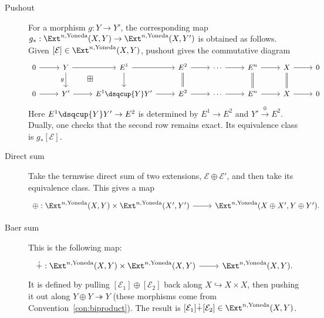 \begin{description}
	\item[Pushout] For a morphism $g:Y\to Y'$, the corresponding map
	$g_*:\Ext^{n,\text{Yoneda}}(X,Y)\to
	\Ext^{n,\text{Yoneda}}(X,Y')$ is obtained as follows. Given
	$[\mathcal{E}]\in\Ext^{n,\text{Yoneda}}(X,Y)$, pushout gives the
	commutative diagram
	\[\begin{tikzcd}[every cell/.append style={font=\small}]
		0 \arrow[r] & Y \arrow[r] \arrow[d, "g"'] \arrow[phantom, rd, "\boxplus" description] & E^1 \arrow[r] \arrow[d] & E^2 \arrow[r] \arrow[equal, d] & \cdots \arrow[r] & E^n \arrow[equal, d] \arrow[r] & X \arrow[equal, d] \arrow[r] & 0 \\
		0 \arrow[r] & Y' \arrow[r] & E^1 \dsqcup{Y} Y' \arrow[r] & E^2 \arrow[r] & \cdots \arrow[r] & E^n \arrow[r] & X \arrow[r] & 0
	\end{tikzcd}\]
	Here $E^1\dsqcup{Y}Y'\to E^2$ is determined by $E^1\to E^2$ and
	$Y'\xrightarrow{0}E^2$. Dually, one checks that the second row remains
	exact. Its equivalence class is $g_*[\mathcal{E}]$.

	\item[Direct sum] Take the termwise direct sum of two extensions,
	$\mathcal{E}\oplus\mathcal{E}'$, and then take its equivalence class.
	This gives a map
	\[\begin{tikzcd}
		\oplus: \Ext^{n, \text{Yoneda}}(X, Y) \times \Ext^{n, \text{Yoneda}}(X', Y') \arrow[r] & \Ext^{n, \text{Yoneda}}(X \oplus X', Y \oplus Y') .
	\end{tikzcd}\]

	\item[Baer sum] This is the following map:
	\[\begin{tikzcd}
		\dot{+}: \Ext^{n, \text{Yoneda}}(X, Y) \times \Ext^{n, \text{Yoneda}}(X, Y) \arrow[r] & \Ext^{n, \text{Yoneda}}(X, Y).
	\end{tikzcd}\]
	It is defined by pulling $[\mathcal{E}_1]\oplus[\mathcal{E}_2]$ back
	along $X\hookrightarrow X\times X$, then pushing it out along
	$Y\oplus Y\twoheadrightarrow Y$ (these morphisms come from
	Convention~\ref{con:biproduct}). The result is
	$[\mathcal{E}_1]\dot{+}[\mathcal{E}_2]\in
	\Ext^{n,\text{Yoneda}}(X,Y)$.
\end{description}

